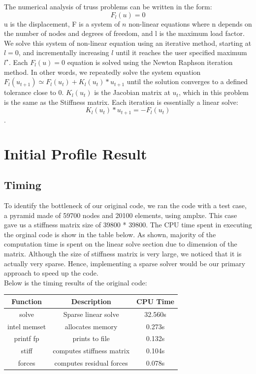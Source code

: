 \documentclass[11pt]{article}
\begin{document}
The numerical analysis of truss problems can be written in the form:
$$F_l(u)=0$$
u is the displacement, F is a system of $n$ non-linear equations where n depends on the number of nodes and degrees of freedom, and l is the maximum load factor.\\

We solve this system of non-linear equation using an iterative method, starting at $l=0$, and incrementally increasing $l$ until it reaches the user specified maximum $l^{\star}$. Each $F_l(u)=0$ equation is solved using the Newton Raphson iteration method. In other words, we repeatedly solve the system equation $F_l(u_{t+1}) \simeq F_l(u_t) + K_l(u_t)*u_{t+1}$ until the solution converges to a defined tolerance close to 0. $K_l(u_t)$ is the Jacobian matrix at $u_t$, which in this problem is the same as the Stiffness matrix. Each iteration is essentially a linear solve:
$$K_l(u_t)*u_{t+1}=-F_l(u_t)$$.

\section{Initial Profile Result}\label{sec:profiling}

\subsection{Timing}
To identify the bottleneck of our original code, we ran the code with a test case, a pyramid made of 59700 nodes and 20100 elements, using amplxe. This case gave us a stiffness matrix size of 39800 * 39800. The CPU time spent in executing the orginal code is show in the table below. As shown, majority of the computation time is spent on the linear solve section due to dimension of the matrix. Although the size of stiffness matrix is very large, we noticed that it is actually very sparse. Hence, implementing a sparse solver would be our primary approach to speed up the code. \\

Below is the timing results of the original code:

\begin{center}
	\begin{tabular}{||c c c ||} 
		\hline
		Function & Description & CPU Time \\ [0.5ex] 
		\hline\hline
		solve & Sparse linear solve & 32.560s  \\ 
		\hline
		intel memset  & allocates memory & 0.273s  \\
		\hline
		printf fp & prints to file & 0.132s  \\
		\hline
		stiff & computes stiffness matrix & 0.104s  \\
		\hline
		forces & computes residual forces & 0.078s  \\[1ex] 
		\hline
	\end{tabular}
\end{center}
\end{document}
